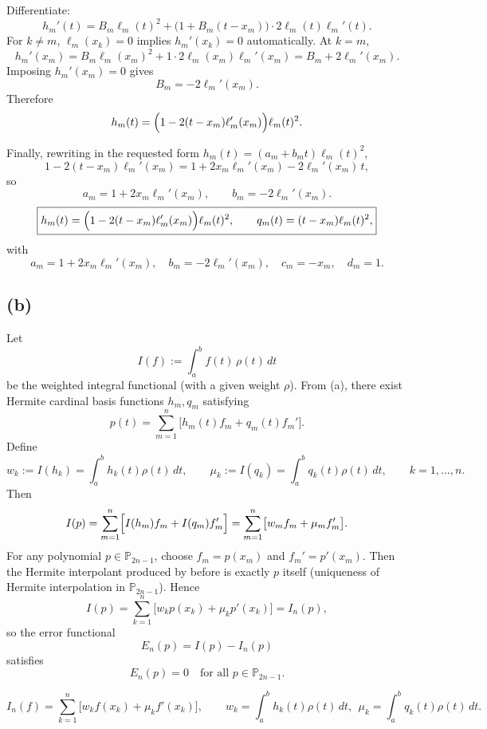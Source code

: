 \documentclass[a4paper]{article}
\begin{document}
Differentiate:
\[
h_m'(t)=B_m\ell_m(t)^2+\bigl(1+B_m(t-x_m)\bigr)\cdot 2\ell_m(t)\ell_m'(t).
\]
For \(k\neq m\), \(\ell_m(x_k)=0\) implies \(h_m'(x_k)=0\) automatically.
At \(k=m\),
\[
h_m'(x_m)=B_m\ell_m(x_m)^2+1\cdot 2\ell_m(x_m)\ell_m'(x_m)
= B_m+2\ell_m'(x_m).
\]
Imposing \(h_m'(x_m)=0\) gives
\[
B_m=-2\ell_m'(x_m).
\]
Therefore
\[
h_m(t)=\Bigl(1-2(t-x_m)\ell_m'(x_m)\Bigr)\ell_m(t)^2.
\]

Finally, rewriting in the requested form \(h_m(t)=(a_m+b_m t)\ell_m(t)^2\),
\[
1-2(t-x_m)\ell_m'(x_m)=1+2x_m\ell_m'(x_m)-2\ell_m'(x_m)\,t,
\]
so
\[
\boxed{a_m=1+2x_m\ell_m'(x_m),\qquad b_m=-2\ell_m'(x_m).}
\]
\[
\boxed{
h_m(t)=\Bigl(1-2(t-x_m)\ell_m'(x_m)\Bigr)\ell_m(t)^2,\qquad
q_m(t)=(t-x_m)\ell_m(t)^2,
}
\]
with
\[
\boxed{
a_m=1+2x_m\ell_m'(x_m),\quad b_m=-2\ell_m'(x_m),\quad
c_m=-x_m,\quad d_m=1.
}
\] 
\subsection*{(b)}
Let
\[
I(f):=\int_a^b f(t)\,\rho(t)\,dt
\]
be the weighted integral functional (with a given weight \(\rho\)).
From (a), there exist Hermite cardinal basis functions \(h_m,q_m\) satisfying
\[
p(t)=\sum_{m=1}^{n}\bigl[h_m(t)f_m+q_m(t)f_m'\bigr].
\]
Define
\[
w_k:=I(h_k)=\int_a^b h_k(t)\rho(t)\,dt,\qquad
\mu_k:=I(q_k)=\int_a^b q_k(t)\rho(t)\,dt,\qquad k=1,\dots,n.
\]
Then
\[
I(p)
=\sum_{m=1}^{n}\Bigl[I(h_m)f_m+I(q_m)f_m'\Bigr]
=\sum_{m=1}^{n}\bigl[w_m f_m+\mu_m f_m'\bigr].
\]
For any polynomial \(p\in\mathbb P_{2n-1}\), choose \(f_m=p(x_m)\) and \(f_m'=p'(x_m)\).
Then the Hermite interpolant produced by before is exactly \(p\) itself (uniqueness of
Hermite interpolation in \(\mathbb P_{2n-1}\)).
Hence 
\[
I(p)=\sum_{k=1}^{n}\bigl[w_k p(x_k)+\mu_k p'(x_k)\bigr]=I_n(p),
\]
so the error functional
\[
E_n(p)=I(p)-I_n(p)
\]
satisfies
\[
\boxed{ \ E_n(p)=0\quad \text{for all }p\in\mathbb P_{2n-1}. \ }
\]

\[
\boxed{
I_n(f)=\sum_{k=1}^{n}\bigl[w_k f(x_k)+\mu_k f'(x_k)\bigr],\qquad
w_k=\int_a^b h_k(t)\rho(t)\,dt,\ \ \mu_k=\int_a^b q_k(t)\rho(t)\,dt.
}
\]
\end{document}
